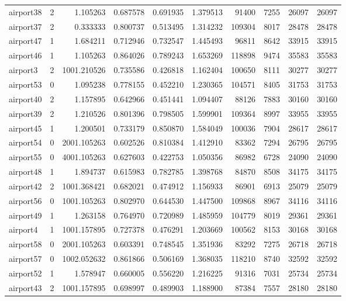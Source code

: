 \begin{longtable}{|l|r|r|r|r|r|r|r|r|r|}
airport38 & 2 & 1.105263 & 0.687578 & 0.691935 & 1.379513 & 91400 & 7255 & 26097 & 26097 \\
airport37 & 2 & 0.333333 & 0.800737 & 0.513495 & 1.314232 & 109304 & 8017 & 28478 & 28478 \\
airport47 & 1 & 1.684211 & 0.712946 & 0.732547 & 1.445493 & 96811 & 8642 & 33915 & 33915 \\
airport46 & 1 & 1.105263 & 0.864026 & 0.789243 & 1.653269 & 118898 & 9474 & 35583 & 35583 \\
airport3 & 2 & 1001.210526 & 0.735586 & 0.426818 & 1.162404 & 100650 & 8111 & 30277 & 30277 \\
airport53 & 0 & 1.095238 & 0.778155 & 0.452210 & 1.230365 & 104571 & 8405 & 31753 & 31753 \\
airport40 & 2 & 1.157895 & 0.642966 & 0.451441 & 1.094407 & 88126 & 7883 & 30160 & 30160 \\
airport39 & 2 & 1.210526 & 0.801396 & 0.798505 & 1.599901 & 109364 & 8997 & 33955 & 33955 \\
airport45 & 1 & 1.200501 & 0.733179 & 0.850870 & 1.584049 & 100036 & 7904 & 28617 & 28617 \\
airport54 & 0 & 2001.105263 & 0.602526 & 0.810384 & 1.412910 & 83362 & 7294 & 26795 & 26795 \\
airport55 & 0 & 4001.105263 & 0.627603 & 0.422753 & 1.050356 & 86982 & 6728 & 24090 & 24090 \\
airport48 & 1 & 1.894737 & 0.615983 & 0.782785 & 1.398768 & 84870 & 8508 & 34175 & 34175 \\
airport42 & 2 & 1001.368421 & 0.682021 & 0.474912 & 1.156933 & 86901 & 6913 & 25079 & 25079 \\
airport56 & 0 & 1001.105263 & 0.802970 & 0.644530 & 1.447500 & 109868 & 8967 & 34116 & 34116 \\
airport49 & 1 & 1.263158 & 0.764970 & 0.720989 & 1.485959 & 104779 & 8019 & 29361 & 29361 \\
airport4 & 1 & 1001.157895 & 0.727378 & 0.476291 & 1.203669 & 100562 & 8153 & 30168 & 30168 \\
airport58 & 0 & 2001.105263 & 0.603391 & 0.748545 & 1.351936 & 83292 & 7275 & 26718 & 26718 \\
airport57 & 0 & 1002.052632 & 0.861866 & 0.506169 & 1.368035 & 118210 & 8740 & 32592 & 32592 \\
airport52 & 1 & 1.578947 & 0.660005 & 0.556220 & 1.216225 & 91316 & 7031 & 25734 & 25734 \\
airport43 & 2 & 1001.157895 & 0.698997 & 0.489903 & 1.188900 & 87384 & 7557 & 28180 & 28180 \\

\end{longtable}
